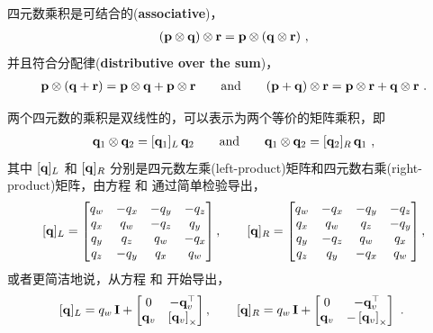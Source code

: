 四元数乘积是可结合的(\textbf{associative})，
%
\begin{align}
({\bf p}\otimes{\bf q})\otimes{\bf r} = {\bf p}\otimes({\bf q}\otimes{\bf r})~,
\end{align}
%
并且符合分配律(\textbf{distributive over the sum})，
%
\begin{align}
{\bf p}\otimes({\bf q}+{\bf r}) = {\bf p}\otimes{\bf q} + {\bf p}\otimes{\bf r}
\qquad \textrm{and} \qquad
({\bf p}+{\bf q})\otimes{\bf r} = {\bf p}\otimes{\bf r} + {\bf q}\otimes{\bf r}~.
\end{align}
%



两个四元数的乘积是双线性的，可以表示为两个等价的矩阵乘积，即
%
\begin{align}
{\bf q}_1\otimes{\bf q}_2 = [{\bf q}_1]_L\,{\bf q}_2 
\qquad \textrm{and} \qquad
{\bf q}_1\otimes{\bf q}_2 = [{\bf q}_2]_R\,{\bf q}_1 ~, \label{equ:quatMatProd}
\end{align}%
%
其中 $[{\bf q}]_L$ 和 $[{\bf q}]_R$ 分别是四元数左乘(left-product)矩阵和四元数右乘(right-product)矩阵，由方程  和  通过简单检验导出，
%
\begin{align}
[{\bf q}]_L = \begin{bmatrix}
q_w &-q_x &-q_y &-q_z\\
q_x & q_w &-q_z & q_y\\
q_y & q_z & q_w &-q_x\\
q_z &-q_y & q_x & q_w\\
\end{bmatrix}, \qquad
[{\bf q}]_R = \begin{bmatrix}
q_w &-q_x &-q_y &-q_z\\
q_x & q_w & q_z &-q_y\\
q_y &-q_z & q_w & q_x\\
q_z & q_y &-q_x & q_w\\
\end{bmatrix} ,
\label{equ:quatMatrixComponents}
\end{align}%
%
或者更简洁地说，从方程  和  开始导出，
%
\begin{align}
[{\bf q}]_L = q_w\,{\bf I} + \begin{bmatrix}
0 & -{\bf q}_v^{\top} \\
{\bf q}_v & \left[{\bf q}_v\right]_\times
\end{bmatrix}, \qquad
[{\bf q}]_R = q_w\,{\bf I} + \begin{bmatrix}
0 & -{\bf q}_v^{\top} \\
{\bf q}_v & -\left[{\bf q}_v\right]_\times
\end{bmatrix}~.
\label{equ:quatMatrix}
 ~
\end{align}%

